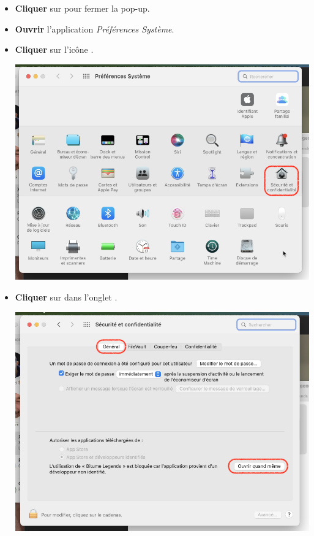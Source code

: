 \documentclass[a4paper,12pt]{article}
\begin{document}
        \begin{itemize}
            \item 
                \textbf{Cliquer} sur  pour fermer la pop-up.
            \item
                \textbf{Ouvrir} l'application \textsl{Préférences Système}.
            \item
                \textbf{Cliquer} sur l'icône .
                \begin{center}
                    \includegraphics[scale=0.35]{install_macos_sp.png}
                \end{center}
                \clearpage
            \item
                \textbf{Cliquer} sur \; dans l'onglet
                .
                \begin{center}
                    \includegraphics[scale=0.35]{install_macos_security.png}

\end{center}
\end{itemize}
\end{document}

